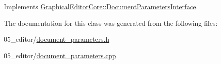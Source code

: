 Implements \hyperlink{classGraphicalEditorCore_1_1DocumentParametersInterface_a8e96d1aa50d0b2bd3ef21fafaeaa4261}{Graphical\+Editor\+Core\+::\+Document\+Parameters\+Interface}.



The documentation for this class was generated from the following files\+:\begin{DoxyCompactItemize}
\item 
05\+\_\+editor/\hyperlink{document__parameters_8h}{document\+\_\+parameters.\+h}\item 
05\+\_\+editor/\hyperlink{document__parameters_8cpp}{document\+\_\+parameters.\+cpp}\end{DoxyCompactItemize}

